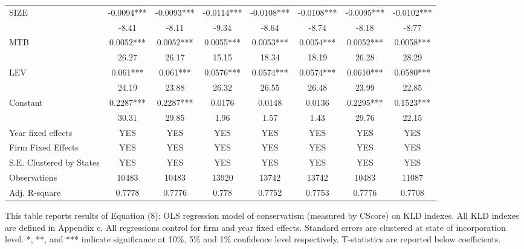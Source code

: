 \begin{landscape}
\begin{table}[H]
\begin{tabular}{lccccccc}
			SIZE  & -0.0094*** & -0.0093*** & -0.0114*** & -0.0108*** & -0.0108*** & -0.0095*** & -0.0102*** \\
			& -8.41 & -8.11 & -9.34 & -8.64 & -8.74 & -8.18 & -8.77 \\
			MTB   & 0.0052*** & 0.0052*** & 0.0055*** & 0.0053*** & 0.0054*** & 0.0052*** & 0.0058*** \\
			& 26.27 & 26.17 & 15.15 & 18.34 & 18.19 & 26.28 & 28.29 \\
			LEV   & 0.061*** & 0.061*** & 0.0576*** & 0.0574*** & 0.0574*** & 0.0610*** & 0.0580*** \\
			& 24.19 & 23.88 & 26.32 & 26.55 & 26.48 & 23.99 & 22.85 \\
			Constant & 0.2287*** & 0.2287*** & 0.0176 & 0.0148 & 0.0136 & 0.2295*** & 0.1523*** \\
			& 30.31 & 29.85 & 1.96  & 1.57  & 1.43  & 29.76 & 22.15 \\
			Year fixed effects & YES   & YES   & YES   & YES   & YES   & YES   & YES \\
			Firm Fixed Effects & YES   & YES   & YES   & YES   & YES   & YES   & YES \\
			S.E. Clustered by States & YES   & YES   & YES   & YES   & YES   & YES   & YES \\
			Observations    & 10483 & 10483 & 13920 & 13742 & 13742 & 10483 & 11087 \\
			Adj. R-square & 0.7778 & 0.7776 & 0.778 & 0.7752 & 0.7753 & 0.7776 & 0.7708 \\
			\bottomrule
			\bottomrule
		\end{tabular}%
		\label{tab:addlabel}%
	\end{table}%
	
	\noindent This table reports results of Equation (8): OLS regression model of conservatism (measured by C\textunderscore Score) on KLD indexes. All KLD indexes are defined in Appendix c. All regressions control for firm and year fixed effects. Standard errors are clustered at state of incorporation level. *, **, and *** indicate significance at 10\%, 5\% and 1\% confidence level respectively. T-statistics are reported below coefficients.
	
\end{landscape}
\restoregeometry

